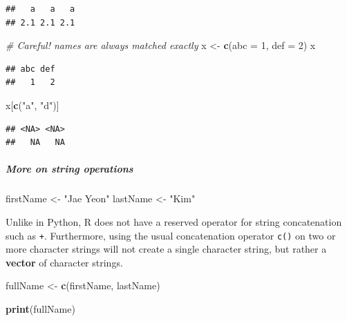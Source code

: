 \documentclass[
]{book}
\newenvironment{Shaded}{\begin{snugshade}}{\end{snugshade}}
\newcommand{\AttributeTok}[1]{\textcolor[rgb]{0.13,0.29,0.53}{#1}}
\newcommand{\CommentTok}[1]{\textcolor[rgb]{0.56,0.35,0.01}{\textit{#1}}}
\newcommand{\DecValTok}[1]{\textcolor[rgb]{0.00,0.00,0.81}{#1}}
\newcommand{\FunctionTok}[1]{\textcolor[rgb]{0.13,0.29,0.53}{\textbf{#1}}}
\newcommand{\NormalTok}[1]{#1}
\newcommand{\OtherTok}[1]{\textcolor[rgb]{0.56,0.35,0.01}{#1}}
\newcommand{\StringTok}[1]{\textcolor[rgb]{0.31,0.60,0.02}{#1}}
\begin{document}
\begin{verbatim}
##   a   a   a 
## 2.1 2.1 2.1
\end{verbatim}

\begin{Shaded}
\begin{Highlighting}[]
\CommentTok{\# Careful! names are always matched exactly}
\NormalTok{x }\OtherTok{\textless{}{-}} \FunctionTok{c}\NormalTok{(}\AttributeTok{abc =} \DecValTok{1}\NormalTok{, }\AttributeTok{def =} \DecValTok{2}\NormalTok{)}
\NormalTok{x}
\end{Highlighting}
\end{Shaded}

\begin{verbatim}
## abc def 
##   1   2
\end{verbatim}

\begin{Shaded}
\begin{Highlighting}[]
\NormalTok{x[}\FunctionTok{c}\NormalTok{(}\StringTok{"a"}\NormalTok{, }\StringTok{"d"}\NormalTok{)]}
\end{Highlighting}
\end{Shaded}

\begin{verbatim}
## <NA> <NA> 
##   NA   NA
\end{verbatim}

\subparagraph{More on string operations}\label{more-on-string-operations}

\begin{Shaded}
\begin{Highlighting}[]
\NormalTok{firstName }\OtherTok{\textless{}{-}} \StringTok{"Jae Yeon"}
\NormalTok{lastName }\OtherTok{\textless{}{-}} \StringTok{"Kim"}
\end{Highlighting}
\end{Shaded}

Unlike in Python, R does not have a reserved operator for string concatenation such as \texttt{+}. Furthermore, using the usual concatenation operator \texttt{c()} on two or more character strings will not create a single character string, but rather a \textbf{vector} of character strings.

\begin{Shaded}
\begin{Highlighting}[]
\NormalTok{fullName }\OtherTok{\textless{}{-}} \FunctionTok{c}\NormalTok{(firstName, lastName)}

\FunctionTok{print}\NormalTok{(fullName)}
\end{Highlighting}
\end{Shaded}
\end{document}
